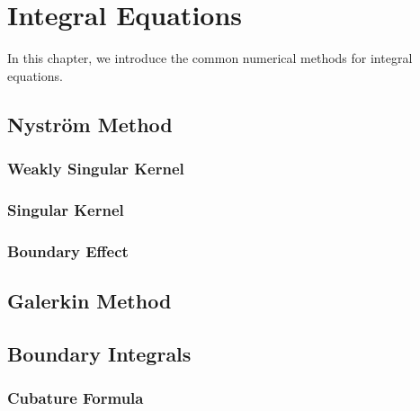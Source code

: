 \chapter{Integral Equations}
In this chapter, we introduce the common numerical methods for integral equations.  
\section{Nystr\"om Method}
\subsection{Weakly Singular Kernel}
\subsection{Singular Kernel}
\subsection{Boundary Effect}

\section{Galerkin Method}

\section{Boundary Integrals}

\subsection{Cubature Formula}